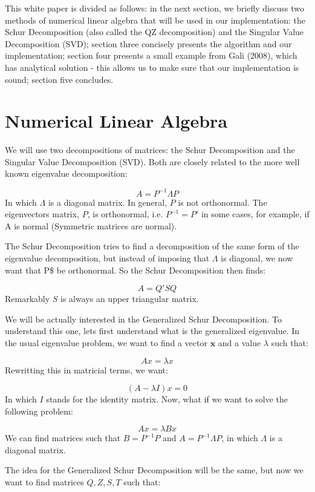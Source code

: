 \documentclass[12pt,a4paper]{article}
\begin{document}
This white paper is divided as follows: in the next section, we briefly discuss two methods of numerical linear algebra that will be used in our implementation: the Schur Decomposition (also called the QZ decomposition) and the Singular Value Decomposition (SVD); section three concisely presents the algorithm and our implementation; section four presents a small example from Gali (2008), which has analytical solution - this allows us to make sure that our implementation is sound; section five concludes.

\section{Numerical Linear Algebra}
We will use two decompositions of matrices: the Schur Decomposition and the Singular Value Decomposition (SVD). Both are closely related to the more well known eigenvalue decomposition:

\[
A = P^{-1}\Lambda P
\]
In which $\Lambda$ is a diagonal matrix. In general, $P$ is not orthonormal. The eigenvectors matrix, $P$, is orthonormal, i.e. $P^{-1} = P'$ in some cases, for example, if A is normal (Symmetric matrices are normal).

The Schur Decomposition tries to find a decomposition	of the same form of the eigenvalue decomposition, but instead of imposing that $\Lambda$ is diagonal, we now want that P\$ be orthonormal. So the Schur Decomposition then finds:

\[
A = Q'SQ
\]
Remarkably $S$ is always an upper triangular matrix.

We will be actually interested in the Generalized Schur Decomposition. To understand this one, lets first understand what is the generalized eigenvalue. In the usual eigenvalue problem, we want to find a vector $\mathbf{x}$ and a value $\lambda$ such that:

\[
Ax = \lambda x
\]
Rewritting this in matricial terms, we want:

\[
(A - \lambda I)x = 0
\]
In which $I$ stands for the identity matrix. Now, what if we want to solve the following problem:

\[
Ax = \lambda{}Bx
\]
We can find matrices such that $B = P^{-1}P$ and $A = P^{-1}\Lambda{}P$, in which $\Lambda$ is a diagonal matrix.

The idea for the Generalized Schur Decomposition will be the same, but now we want to find matrices $Q,Z,S,T$ such that:
\end{document}
